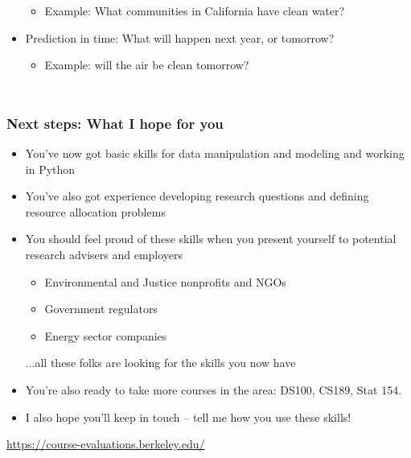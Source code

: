 \documentclass[mathserif, aspectratio=169]{beamer}
\begin{document}
\begin{frame}
\begin{columns}[c]
\begin{itemize}
				\begin{itemize}
					\item Example: What communities in California have clean water?
				\end{itemize}
				\item Prediction in time: What will happen next year, or tomorrow?  
				\begin{itemize}
					\item Example: will the air be clean tomorrow?
				\end{itemize}
			\end{itemize}
	\end{columns}
\end{frame}

\begin{frame}
	\frametitle{Next steps: What I hope for you}
	\begin{itemize}
		\item You've now got basic skills for data manipulation and modeling and working in Python
		\item You've also got experience developing research questions and defining resource allocation problems
		\item You should feel proud of these skills when you present yourself to potential research advisers and employers
		\begin{itemize}
			\item Environmental and Justice nonprofits and NGOs
			\item Government regulators
			\item Energy sector companies
		\end{itemize}
		...all these folks are looking for the skills you now have
		\item You're also ready to take more courses in the area: DS100, CS189, Stat 154.
		\item I also hope you'll keep in touch -- tell me how you use these skills!
	\end{itemize}
\end{frame}


\begin{frame}
\center
	\href{https://course-evaluations.berkeley.edu/}{https://course-evaluations.berkeley.edu/}
\end{frame}
\end{document}
